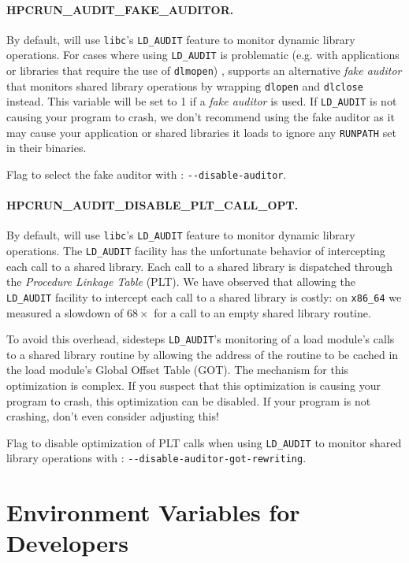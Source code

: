 \paragraph{HPCRUN\_AUDIT\_FAKE\_AUDITOR.}

By default, \hpcrun{} will use \verb|libc|'s \verb|LD_AUDIT| feature to monitor dynamic library operations. 
For cases where using \verb|LD_AUDIT| is problematic (e.g. with applications or libraries that require the use of {\tt dlmopen}) , 
\hpcrun{} supports an alternative {\em fake auditor} that monitors shared library operations by wrapping {\tt dlopen} and {\tt dlclose} instead. This variable will be set to 1 if a {\em fake auditor} is used. 
If \verb|LD_AUDIT| is not causing your program to crash, we don't recommend using the fake auditor as it may cause your application or shared libraries it loads to ignore any {\tt RUNPATH} set in their binaries.

\parg
Flag to select the fake auditor with \hpcrun: \verb|--disable-auditor|.

\paragraph{HPCRUN\_AUDIT\_DISABLE\_PLT\_CALL\_OPT.}

By default, \hpcrun{} will use \verb|libc|'s \verb|LD_AUDIT| feature to monitor dynamic library operations. The \verb|LD_AUDIT| facility has the unfortunate behavior of intercepting each call to a shared library. Each call to a shared library is dispatched through  the {\em Procedure Linkage Table} (PLT). We have observed that allowing the \verb|LD_AUDIT| facility to intercept each call to a shared library is costly: on {\tt x86\_64} we measured a slowdown of $68\times$ for a call to an empty shared library routine. 

To avoid this overhead, \hpcrun{} sidesteps \verb|LD_AUDIT|'s monitoring of a load module's calls to a shared library routine by allowing the address of the routine to be cached in the load module's Global Offset Table (GOT). The mechanism for this optimization is complex. If you suspect that this optimization is causing your program to crash, this optimization can be disabled. If your program is not crashing, don't even consider adjusting this!

\parg
Flag to disable optimization of PLT calls when using \verb|LD_AUDIT|  to monitor shared library operations with \hpcrun: \verb|--disable-auditor-got-rewriting|.

\section{Environment Variables for Developers}
\label{system-env}

